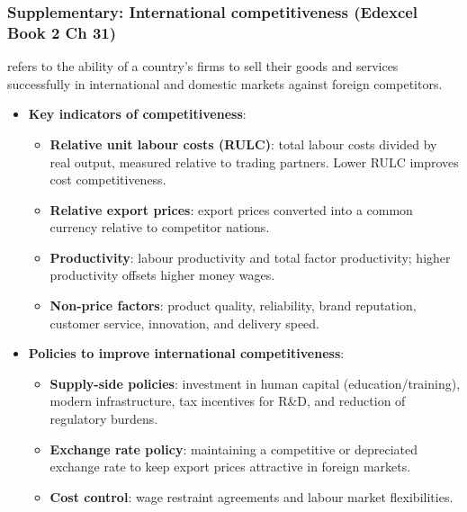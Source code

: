 \subsubsection*{Supplementary: International competitiveness (Edexcel Book 2 Ch 31)}
 refers to the ability of a country's firms to sell their goods and services successfully in international and domestic markets against foreign competitors.
\begin{itemize}
  \item \textbf{Key indicators of competitiveness}:
  \begin{itemize}
    \item \textbf{Relative unit labour costs (RULC)}: total labour costs divided by real output, measured relative to trading partners. Lower RULC improves cost competitiveness.
    \item \textbf{Relative export prices}: export prices converted into a common currency relative to competitor nations.
    \item \textbf{Productivity}: labour productivity and total factor productivity; higher productivity offsets higher money wages.
    \item \textbf{Non-price factors}: product quality, reliability, brand reputation, customer service, innovation, and delivery speed.
  \end{itemize}
  \item \textbf{Policies to improve international competitiveness}:
  \begin{itemize}
    \item \textbf{Supply-side policies}: investment in human capital (education/training), modern infrastructure, tax incentives for R\&D, and reduction of regulatory burdens.
    \item \textbf{Exchange rate policy}: maintaining a competitive or depreciated exchange rate to keep export prices attractive in foreign markets.
    \item \textbf{Cost control}: wage restraint agreements and labour market flexibilities.
  \end{itemize}
\end{itemize}

